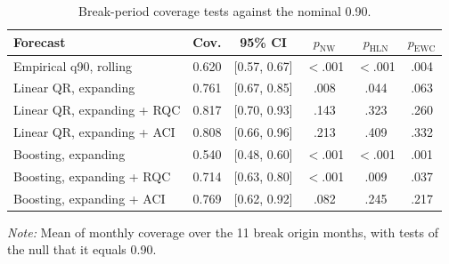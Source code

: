 \begin{table}[t]
\caption{Break-period coverage tests against the nominal 0.90.\label{tab:coverage}}
\centering\footnotesize
\begin{tabular*}{\columnwidth}{@{\extracolsep\fill}lrcccc@{}}
\toprule
\textbf{Forecast} & \textbf{Cov.} & \textbf{95\% CI} & $p_{\mathrm{NW}}$ & $p_{\mathrm{HLN}}$ & $p_{\mathrm{EWC}}$ \\
\midrule
Empirical q90, rolling & 0.620 & [0.57, 0.67] & $<$.001 & $<$.001 & .004 \\
Linear QR, expanding & 0.761 & [0.67, 0.85] & .008 & .044 & .063 \\
Linear QR, expanding + RQC & 0.817 & [0.70, 0.93] & .143 & .323 & .260 \\
Linear QR, expanding + ACI & 0.808 & [0.66, 0.96] & .213 & .409 & .332 \\
Boosting, expanding & 0.540 & [0.48, 0.60] & $<$.001 & $<$.001 & .001 \\
Boosting, expanding + RQC & 0.714 & [0.63, 0.80] & $<$.001 & .009 & .037 \\
Boosting, expanding + ACI & 0.769 & [0.62, 0.92] & .082 & .245 & .217 \\
\bottomrule
\end{tabular*}
\begin{tablenotes}
\item \textit{Note:} Mean of monthly coverage over the 11 break origin months, with tests of the null that it equals 0.90.
\end{tablenotes}
\end{table}
